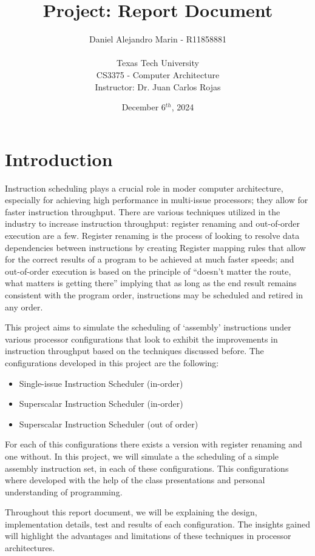 \documentclass{article}
\title{Project: Report Document}
\author{Daniel Alejandro Marin - R11858881\\ \\ Texas Tech University \\CS3375 - Computer Architecture \\ Instructor: Dr. Juan Carlos Rojas}
\date{December 6$^{th}$, 2024}
\begin{document}
\maketitle
\tableofcontents
\newpage
\section{Introduction}
Instruction scheduling plays a crucial role in moder computer architecture, especially for achieving high performance in multi-issue processors; they allow for faster instruction throughput. There are various techniques utilized in the industry to increase instruction throughput: register renaming and out-of-order execution are a few. Register renaming is the process of looking to resolve data dependencies between instructions by creating Register mapping rules that allow for the correct results of a program to be achieved at much faster speeds; and out-of-order execution is based on the principle of ``doesn't matter the route, what matters is getting there'' implying that as long as the end result remains consistent with the program order, instructions may be scheduled and retired in any order. 

This project aims to simulate the scheduling of `assembly' instructions under various processor configurations that look to exhibit the improvements in instruction throughput based on the techniques discussed before. The configurations developed in this project are the following:

\begin{itemize}
    \item Single-issue Instruction Scheduler (in-order)
    \item Superscalar Instruction Scheduler (in-order)
    \item Superscalar Instruction Scheduler (out of order) 
\end{itemize}

For each of this configurations there exists a version with register renaming and one without. In this project, we will simulate a the scheduling of a simple assembly instruction set, in each of these configurations. This configurations where developed with the help of the class presentations and personal understanding of programming.

Throughout this report document, we will be explaining the design, implementation details, test and results of each configuration. The insights gained will highlight the advantages and limitations of these techniques in processor architectures. 
\end{document}
